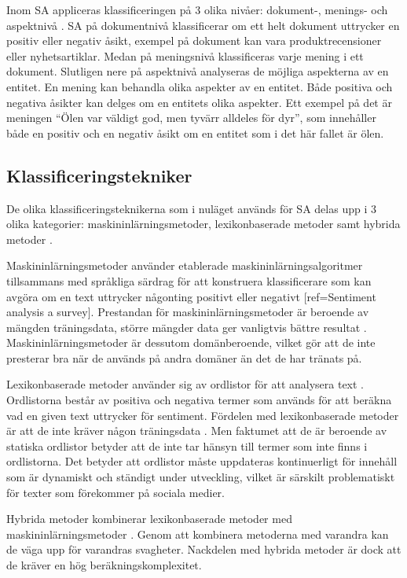 \documentclass{kaumasters} %
\begin{document}
Inom SA appliceras klassificeringen på 3 olika nivåer: dokument-, menings- och aspektnivå \cite{SAsurvey}. SA på dokumentnivå klassificerar om ett helt dokument uttrycker en positiv eller negativ åsikt, exempel på dokument kan vara produktrecensioner eller nyhetsartiklar. Medan på meningsnivå klassificeras varje mening i ett dokument. Slutligen nere på aspektnivå analyseras de möjliga aspekterna av en entitet. En mening kan behandla olika aspekter av en entitet. Både positiva och negativa åsikter kan delges om en entitets olika aspekter. Ett exempel på det är meningen “Ölen var väldigt god, men tyvärr alldeles för dyr”, som innehåller både en positiv och en negativ åsikt om en entitet som i det här fallet är ölen.
\subsection{Klassificeringstekniker} \label{SAkt}
De olika klassificeringsteknikerna som i nuläget används för SA delas upp i 3 olika kategorier: maskininlärningsmetoder, lexikonbaserade metoder samt hybrida metoder \cite{SAsurvey}. 

Maskininlärningsmetoder använder etablerade maskininlärningsalgoritmer tillsammans med språkliga särdrag för att konstruera klassificerare som kan avgöra om en text uttrycker någonting positivt eller negativt [ref=Sentiment analysis a survey]. Prestandan för maskininlärningsmetoder är beroende av mängden träningsdata, större mängder data ger vanligtvis bättre resultat \cite{TSAsurvey}. Maskininlärningsmetoder är dessutom domänberoende, vilket gör att de inte presterar bra när de används på andra domäner än det de har tränats på. 

Lexikonbaserade metoder använder sig av ordlistor för att analysera text \cite{SAsurvey}. Ordlistorna består av positiva och negativa termer som används för att beräkna vad en given text uttrycker för sentiment.
Fördelen med lexikonbaserade metoder är att de inte kräver någon  träningsdata \cite{TSAsurvey}. Men faktumet att de är beroende av statiska ordlistor betyder att de inte tar hänsyn till termer som inte finns i ordlistorna. Det betyder att ordlistor måste uppdateras kontinuerligt för innehåll som är dynamiskt och ständigt under utveckling, vilket är särskilt problematiskt för texter som förekommer på sociala medier. 

Hybrida metoder kombinerar lexikonbaserade metoder med maskininlärningsmetoder \cite{TSAsurvey}. Genom att kombinera metoderna med varandra kan de väga upp för varandras svagheter. Nackdelen med hybrida metoder är dock att de kräver en hög beräkningskomplexitet.
\end{document}
